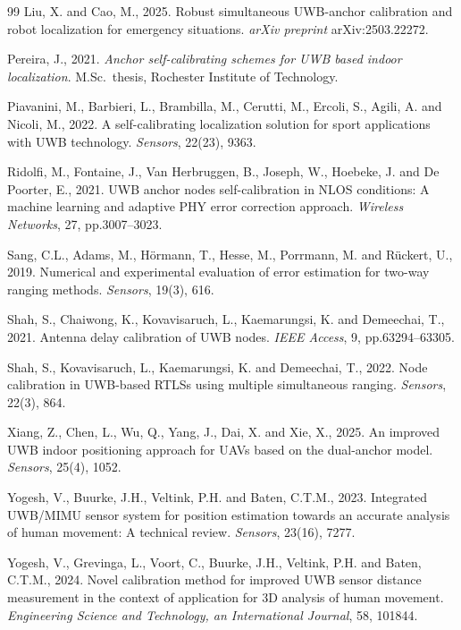 \documentclass[11pt,a4paper]{article}
\begin{document}
\begin{thebibliography}{99}
 Liu, X. and Cao, M., 2025. Robust simultaneous UWB-anchor
calibration and robot localization for emergency situations. \emph{arXiv preprint} arXiv:2503.22272.

 Pereira, J., 2021. \emph{Anchor self-calibrating schemes for
UWB based indoor localization}. M.Sc.\ thesis, Rochester Institute of Technology.

 Piavanini, M., Barbieri, L., Brambilla, M., Cerutti,
M., Ercoli, S., Agili, A. and Nicoli, M., 2022. A self-calibrating localization solution for sport
applications with UWB technology. \emph{Sensors}, 22(23), 9363.

 Ridolfi, M., Fontaine, J., Van Herbruggen, B., Joseph,
W., Hoebeke, J. and De Poorter, E., 2021. UWB anchor nodes self-calibration in NLOS conditions: A
machine learning and adaptive PHY error correction approach. \emph{Wireless Networks}, 27,
pp.3007--3023.

 Sang, C.L., Adams, M., H\"ormann, T., Hesse, M., Porrmann, M. and R\"uckert, U., 2019. Numerical and
experimental evaluation of error estimation for two-way ranging methods. \emph{Sensors}, 19(3), 616.

 Shah, S., Chaiwong, K., Kovavisaruch, L., Kaemarungsi, K. and
Demeechai, T., 2021. Antenna delay calibration of UWB nodes. \emph{IEEE Access}, 9,
pp.63294--63305.

 Shah, S., Kovavisaruch, L., Kaemarungsi, K. and
Demeechai, T., 2022. Node calibration in UWB-based RTLSs using multiple simultaneous ranging.
\emph{Sensors}, 22(3), 864.

 Xiang, Z., Chen, L., Wu, Q., Yang, J., Dai, X. and Xie, X.,
2025. An improved UWB indoor positioning approach for UAVs based on the dual-anchor model.
\emph{Sensors}, 25(4), 1052.

 Yogesh, V., Buurke, J.H., Veltink, P.H. and Baten,
C.T.M., 2023. Integrated UWB/MIMU sensor system for position estimation towards an accurate analysis
of human movement: A technical review. \emph{Sensors}, 23(16), 7277.

 Yogesh, V., Grevinga, L., Voort, C., Buurke, J.H.,
Veltink, P.H. and Baten, C.T.M., 2024. Novel calibration method for improved UWB sensor distance
measurement in the context of application for 3D analysis of human movement. \emph{Engineering
Science and Technology, an International Journal}, 58, 101844.


\end{thebibliography}
\end{document}
